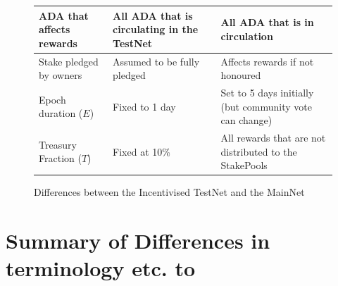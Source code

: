 \documentclass[11pt,a4paper,dvipsnames,twosided,final]{article}
\begin{document}
\begin{figure}[h!]
\begin{center}
\begin{tabular}{||l|p{4cm}|p{4cm}||}
ADA that affects rewards
& All ADA that is circulating in the TestNet
& All ADA that is in circulation
                                              \\\hline
Stake pledged by owners
& Assumed to be fully pledged
& %
Affects rewards if not honoured
                                              \\\hline
Epoch duration ($E$)
& Fixed to 1 day
& Set to 5 days initially (but community vote can change)
                                              \\\hline
Treasury Fraction ($T$)
& Fixed at 10\%
& All rewards that are not distributed to the StakePools
                                              \\\hline
\hline
\end{tabular}
\end{center}
\caption{Differences between the Incentivised TestNet and the MainNet}
\end{figure}

\clearpage



\clearpage
\appendix

\section{Summary of Differences in terminology etc. to \cite{delegation_design}}
\label{app:diffs}
\end{document}
